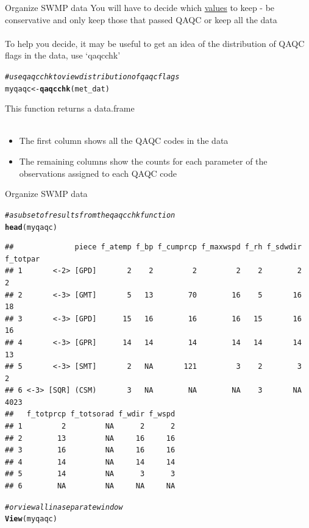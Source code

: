 \documentclass[xcolor=svgnames]{beamer}\usepackage[]{graphicx}\usepackage[]{color}
\makeatletter
\newcommand{\hlcom}[1]{\textcolor[rgb]{0.678,0.584,0.686}{\textit{#1}}}%
\newcommand{\hlstd}[1]{\textcolor[rgb]{0.345,0.345,0.345}{#1}}%
\newcommand{\hlkwb}[1]{\textcolor[rgb]{0.69,0.353,0.396}{#1}}%
\newcommand{\hlkwd}[1]{\textcolor[rgb]{0.737,0.353,0.396}{\textbf{#1}}}%
\newenvironment{kframe}{%
 \def\at@end@of@kframe{}%
 \ifinner\ifhmode%
  \def\at@end@of@kframe{\end{minipage}}%
  \begin{minipage}{\columnwidth}%
 \fi\fi%
 \def\FrameCommand##1{\hskip\@totalleftmargin \hskip-\fboxsep
 \colorbox{shadecolor}{##1}\hskip-\fboxsep
     \hskip-\linewidth \hskip-\@totalleftmargin \hskip\columnwidth}%
 \MakeFramed {\advance\hsize-\width
   \@totalleftmargin\z@ \linewidth\hsize
   \@setminipage}}%
 {\par\unskip\endMakeFramed%
 \at@end@of@kframe}
\newenvironment{knitrout}{}{} %
\makeatother
\begin{document}
\begin{frame}[containsverbatim]{Organize SWMP data}
You will have to decide which \href{http://cdmo.baruch.sc.edu/data/qaqc.cfm}{values} to keep - be conservative and only keep those that passed QAQC or keep all the data \\~\\
To help you decide, it may be useful to get an idea of the distribution of QAQC flags in the data, use `qaqcchk'
\begin{knitrout}\scriptsize
{}\color{fgcolor}\begin{kframe}
\begin{alltt}
\hlcom{# use qaqcchk to view distribution of qaqc flags}
\hlstd{myqaqc} \hlkwb{<-} \hlkwd{qaqcchk}\hlstd{(met_dat)}
\end{alltt}
\end{kframe}
\end{knitrout}
This function returns a data.frame\\~\\
\begin{itemize}
\item The first column shows all the QAQC codes in the data
\item The remaining columns show the counts for each parameter of the observations assigned to each QAQC code
\end{itemize}
\end{frame}

\begin{frame}[containsverbatim]{Organize SWMP data}
\begin{knitrout}\scriptsize
{}\color{fgcolor}\begin{kframe}
\begin{alltt}
\hlcom{# a subset of results from the qaqcchk function}
\hlkwd{head}\hlstd{(myqaqc)}
\end{alltt}
\begin{verbatim}
##              piece f_atemp f_bp f_cumprcp f_maxwspd f_rh f_sdwdir f_totpar
## 1       <-2> [GPD]       2    2         2         2    2        2        2
## 2       <-3> [GMT]       5   13        70        16    5       16       18
## 3       <-3> [GPD]      15   16        16        16   15       16       16
## 4       <-3> [GPR]      14   14        14        14   14       14       13
## 5       <-3> [SMT]       2   NA       121         3    2        3        2
## 6 <-3> [SQR] (CSM)       3   NA        NA        NA    3       NA     4023
##   f_totprcp f_totsorad f_wdir f_wspd
## 1         2         NA      2      2
## 2        13         NA     16     16
## 3        16         NA     16     16
## 4        14         NA     14     14
## 5        14         NA      3      3
## 6        NA         NA     NA     NA
\end{verbatim}
\begin{alltt}
\hlcom{# or view all in a separate window}
\hlkwd{View}\hlstd{(myqaqc)}
\end{alltt}
\end{kframe}
\end{knitrout}
\end{frame}
\end{document}
